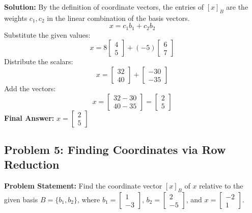 \documentclass[11pt]{article}
\begin{document}
\textbf{Solution:}
By the definition of coordinate vectors, the entries of $[x]_B$ are the weights $c_1, c_2$ in the linear combination of the basis vectors.
\[ x = c_1 b_1 + c_2 b_2 \]
Substitute the given values:
\[ x = 8 \begin{bmatrix} 4 \\ 5 \end{bmatrix} + (-5) \begin{bmatrix} 6 \\ 7 \end{bmatrix} \]
Distribute the scalars:
\[ x = \begin{bmatrix} 32 \\ 40 \end{bmatrix} + \begin{bmatrix} -30 \\ -35 \end{bmatrix} \]
Add the vectors:
\[ x = \begin{bmatrix} 32 - 30 \\ 40 - 35 \end{bmatrix} = \begin{bmatrix} 2 \\ 5 \end{bmatrix} \]
\textbf{Final Answer:} $x = \begin{bmatrix} 2 \\ 5 \end{bmatrix}$

\subsection{Problem 5: Finding Coordinates via Row Reduction}
\textbf{Problem Statement:} Find the coordinate vector $[x]_B$ of $x$ relative to the given basis $B = \{b_1, b_2\}$, where $b_1 = \begin{bmatrix} 1 \\ -3 \end{bmatrix}$, $b_2 = \begin{bmatrix} 2 \\ -5 \end{bmatrix}$, and $x = \begin{bmatrix} -2 \\ 1 \end{bmatrix}$.
\end{document}
